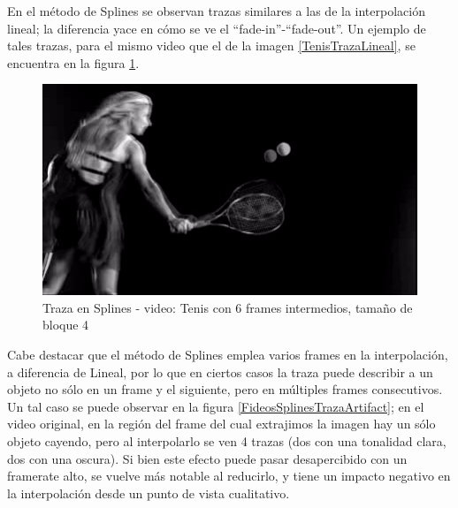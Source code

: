 \par En el m\'etodo de Splines se observan trazas similares a las de la interpolaci\'on lineal; la diferencia yace en c\'omo se ve el ``fade-in''-``fade-out''.
Un ejemplo de tales trazas, para el mismo video que el de la imagen \ref{TenisTrazaLineal}, se encuentra en la figura \ref{TenisTrazaSplines}.

\FloatBarrier
\begin{figure}[h]
\begin{center}
\caption{Traza en Splines - video: Tenis con 6 frames intermedios, tama\~no de bloque 4}
\label{TenisTrazaSplines}
\includegraphics[width=0.9\columnwidth]{imagenes/cualitativos/TTS.png}
\end{center}
\end{figure}
\FloatBarrier

\par Cabe destacar que el m\'etodo de Splines emplea varios frames en la interpolaci\'on, a diferencia de Lineal, por lo que en ciertos casos la traza puede describir a un objeto no s\'olo en un frame y el siguiente, pero en m\'ultiples frames consecutivos.
Un tal caso se puede observar en la figura \ref{FideosSplinesTrazaArtifact}; en el video original, en la regi\'on del frame del cual extrajimos la imagen hay un s\'olo objeto cayendo, pero al interpolarlo se ven 4 trazas (dos con una tonalidad clara, dos con una oscura).
Si bien este efecto puede pasar desapercibido con un framerate alto, se vuelve m\'as notable al reducirlo, y tiene un impacto negativo en la interpolaci\'on desde un punto de vista cualitativo.

